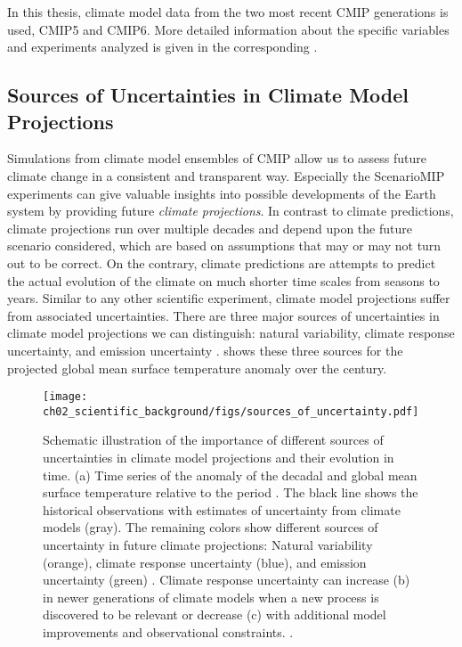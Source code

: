 In this thesis, climate model data from the two most recent \ac{CMIP}
generations is used, \acs{CMIP}5 and \acs{CMIP}6. More detailed information
about the specific variables and experiments analyzed is given in the
corresponding .


\subsection{Sources of Uncertainties in Climate Model Projections}
\label{subsec:02:source_of_uncertainties}

Simulations from climate model ensembles of \ac{CMIP} allow us to assess future
climate change in a consistent and transparent way. Especially the
\ac{ScenarioMIP} experiments can give valuable insights into possible
developments of the Earth system by providing future \emph{climate
  projections}. In contrast to climate predictions, climate projections run
over multiple decades and depend upon the future scenario considered, which are
based on assumptions that may or may not turn out to be correct. On the
contrary, climate predictions are attempts to predict the actual evolution of
the climate on much shorter time scales from seasons to years. Similar to any
other scientific experiment, climate model projections suffer from associated
uncertainties. There are three major sources of uncertainties in climate model
projections we can distinguish: natural variability, climate response
uncertainty, and emission uncertainty \autocite{Hawkins2009, Hawkins2010}.
 shows these three sources for the
projected global mean surface temperature anomaly over the  century.

\begin{figure}[t]
  \centering
  \texttt{[image: 
    ch02\_scientific\_background/figs/sources\_of\_uncertainty.pdf]}
  \caption[
    Schematic illustration of the importance of different sources of
    uncertainties in climate model projections and their evolution in time.
  ]{
    Schematic illustration of the importance of different sources of
    uncertainties in climate model projections and their evolution in time. (a)
    Time series of the anomaly of the decadal and global mean surface
    temperature relative to the period . The black line shows
    the historical observations with estimates of uncertainty from climate
    models (gray). The remaining colors show different sources of uncertainty
    in future climate projections: Natural variability (orange), climate
    response uncertainty (blue), and emission uncertainty (green)
    \autocite{Hawkins2009, Hawkins2010}. Climate response uncertainty can
    increase (b) in newer generations of climate models when a new process is
    discovered to be relevant or decrease (c) with additional model
    improvements and observational constraints.
    .
  }
  \label{fig:02:sources_of_uncertainty}
\end{figure}

